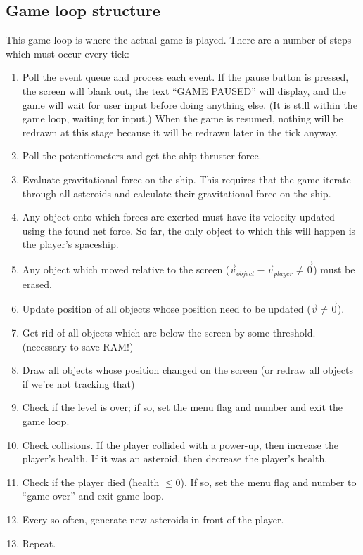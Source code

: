 \documentclass{article}
\begin{document}
\subsection{Game loop structure}

This game loop is where the actual game is played. There are a number of steps which must occur every tick:

\begin{enumerate}
\item Poll the event queue and process each event. If the pause button is pressed, the screen will blank out,
the text ``GAME PAUSED'' will display, and the game will wait for user input before doing anything else. (It is still
within the game loop, waiting for input.) When the game is resumed, nothing will be redrawn at this stage because
it will be redrawn later in the tick anyway.
\item Poll the potentiometers and get the ship thruster force.
\item Evaluate gravitational force on the ship. This requires that the game iterate through all asteroids and calculate 
their gravitational force on the ship.
\item Any object onto which forces are exerted must have its velocity updated using the found net force. So far, the
only object to which this will happen is the player's spaceship.
\item Any object which moved relative to the screen ($\vec{v}_{object} - \vec{v}_{player} \ne \vec0$) must be erased.
\item Update position of all objects whose position need to be updated ($\vec{v} \ne \vec{0}$).
\item Get rid of all objects which are below the screen by some threshold. (necessary to save RAM!)
\item Draw all objects whose position changed on the screen (or redraw all objects if we're not tracking that)
\item Check if the level is over; if so, set the menu flag and number and exit the game loop.
\item Check collisions. If the player collided with a power-up, then increase the player's health. If it was an
asteroid, then decrease the player's health.
\item Check if the player died (health $\le 0$). If so, set the menu flag and number to ``game over'' and exit game loop.
\item Every so often, generate new asteroids in front of the player.
\item Repeat.
\end{enumerate}
\end{document}
